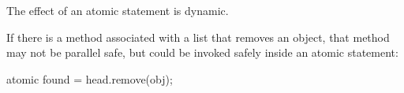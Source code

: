 The effect of an atomic statement is dynamic.

\begin{example}
If there is a method associated with a list that removes an object,
that method may not be parallel safe, but could be invoked safely inside an
atomic statement:
\begin{chapel}
atomic found = head.remove(obj);
\end{chapel}
\end{example}
